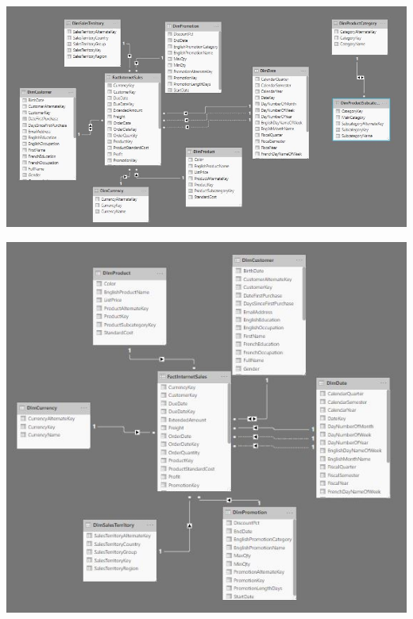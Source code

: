 \documentclass[12pt,letterpaper]{article}
\begin{document}
	\begin{center}
	\includegraphics[width=16cm]{./Imagenes/img}
	\end{center}
	\begin{center}
	\includegraphics[width=16cm]{./Imagenes/img2}
	\end{center}
\end{document}
